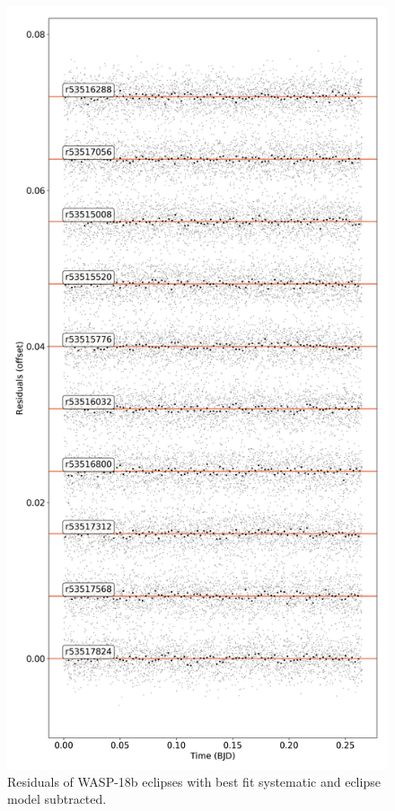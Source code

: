 \begin{subappendices}
\begin{figure}
    \centering
    \includegraphics[height=0.8\textheight]{Residuals_W18b.png}
    \caption{Residuals of WASP-18b eclipses with best fit systematic and eclipse model subtracted.}
    \label{P3:fig:residuallcs}
\end{figure}

\end{subappendices}
